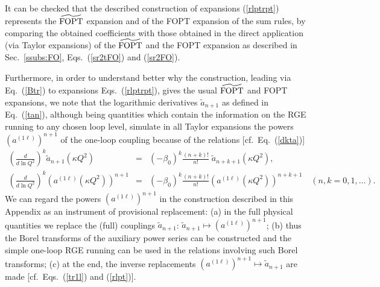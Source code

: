 \documentclass[aps,nofootinbib,showkeys,noshowpacs,preprintnumbers,amsmath,amssymb]{revtex4}
\def\bea{\begin{eqnarray}}
\def\eea{\end{eqnarray}}
\def\bes{\begin{subequations}}
\def\ees{\end{subequations}}
\newcommand{\ta}{{\widetilde a}}
\begin{document}
It can be checked that the described construction of expansions (\ref{rlptrpt}) represents the  ${\widetilde {\rm FOPT}}$ expansion and of the FOPT expansion of the sum rules, by comparing the obtained coefficients with those obtained in the direct application (via Taylor expansions) of the  ${\widetilde {\rm FOPT}}$ and the FOPT expansion as described in Sec.~\ref{ssubs:FO}, Eqs.~(\ref{sr2tFO}) and (\ref{sr2FO}).

Furthermore, in order to understand better why the construction, leading via Eq.~(\ref{Btr}) to expansions Eqs.~(\ref{rlptrpt}), gives the usual ${\widetilde {\rm FOPT}}$ and FOPT expansions, we note that the logarithmic derivatives $\ta_{n+1}$ as defined in Eq.~(\ref{tan}), although being quantities which contain the information on the RGE running to any chosen loop level, simulate in all Taylor expansions the powers $(a^{(1 \ell)})^{n+1}$ of the one-loop coupling because of the relations [cf.~Eq.~(\ref{dkta})]
\bes
\label{dtada1l}
\bea
\left(  \frac{d}{d \ln Q^2} \right)^k  \ta_{n+1}(\kappa Q^2) &=& (-\beta_0)^k \frac{(n+k)!}{n!} \; {\ta}_{n+k+1}(\kappa Q^2),
\label{dta} \\
\left(  \frac{d}{d \ln Q^2} \right)^k  \left( a^{(1 \ell)}(\kappa Q^2) \right)^{n+1}  &=& (-\beta_0)^k \frac{(n+k)!}{n!} \left( a^{(1 \ell)}(\kappa Q^2) \right)^{n+k+1}
\quad (n,k=0,1, \ldots).
\label{da1l} \eea \ees
We can regard the powers $(a^{(1 \ell)})^{n+1}$ in the construction described in this Appendix as an instrument of provisional replacement: (a) in the full physical quantities we replace the (full) couplings $\ta_{n+1}$: $\ta_{n+1} \mapsto (a^{(1 \ell)})^{n+1}$; (b) thus the  Borel transforms of the auxiliary power series can be constructed and the simple one-loop RGE running can be used in the relations involving such Borel transforms; (c) at the end, the inverse replacements $(a^{(1 \ell)})^{n+1} \mapsto \ta_{n+1}$ are made [cf.~Eqs.~(\ref{tr1l}) and (\ref{rlpt})].
\end{document}

